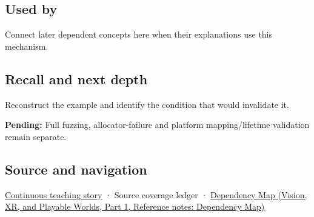 \subsection{Used by}\label{appendix-652d81568de9-used-by}

\hypertarget{appendix-652d81568de9-used-by}{}

Connect later dependent concepts here when their explanations use this mechanism.

\subsection{Recall and next depth}\label{appendix-652d81568de9-recall-and-next-depth}

\hypertarget{appendix-652d81568de9-recall-and-next-depth}{}

Reconstruct the example and identify the condition that would invalidate it.

\textbf{Pending:} Full fuzzing, allocator-failure and platform mapping/lifetime validation remain separate.

\subsection{Source and navigation}\label{appendix-652d81568de9-source-and-navigation}

\hypertarget{appendix-652d81568de9-source-and-navigation}{}

\hyperref[01-foundations-i-ch002-bytes-become-a-durable-agreement]{Continuous teaching story} · {Source coverage ledger} · \href{../07-Vision-XR-and-Playable-Worlds-P01/main.pdf\#nameddest=appendix-4ad47bdd269a}{Dependency Map (Vision, XR, and Playable Worlds, Part 1, Reference notes: Dependency Map)}
